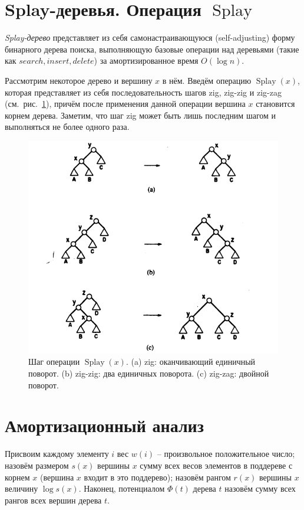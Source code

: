 \documentclass[a4paper,11pt]{article}
\DeclareMathOperator{\splay}{Splay}
\begin{document}
\section{Splay-деревья. Операция \texorpdfstring{\(\splay\)}{Splay}}

{\it Splay-дерево} представляет из себя самонастраивающуюся (self-adjusting) форму бинарного дерева поиска, выполняющую базовые операции над деревьями (такие как \(search, insert, delete\)) за амортизированное время \(O(\log{n})\).

Рассмотрим некоторое дерево и вершину \(x\) в нём. Введём операцию \(\splay(x)\), которая представляет из себя последовательность шагов zig, zig-zig и zig-zag (см.~рис.~\ref{fig:zigas}), причём после применения данной операции вершина \(x\) становится корнем дерева. Заметим, что шаг zig может быть лишь последним шагом и выполняться не более одного раза.

\begin{figure}[h] \centering
    \includegraphics[scale=.5]{img/zigas.png}
    \caption{Шаг операции \(\splay(x)\). (a) zig: оканчивающий единичный поворот. (b) zig-zig: два единичных поворота. (c) zig-zag: двойной поворот.}
    \label{fig:zigas}
\end{figure}

\section{Амортизационный анализ}

Присвоим каждому элементу \(i\) вес \(w(i)\) -- произвольное положительное число; назовём размером \(s(x)\) вершины \(x\) сумму всех весов элементов в поддереве с корнем \(x\) (вершина \(x\) входит в это поддерево); назовём рангом \(r(x)\) вершины \(x\) величину \(\log{s(x)}\). Наконец, потенциалом \(\Phi(t)\) дерева \(t\) назовём сумму всех рангов всех вершин дерева \(t\).
\end{document}
